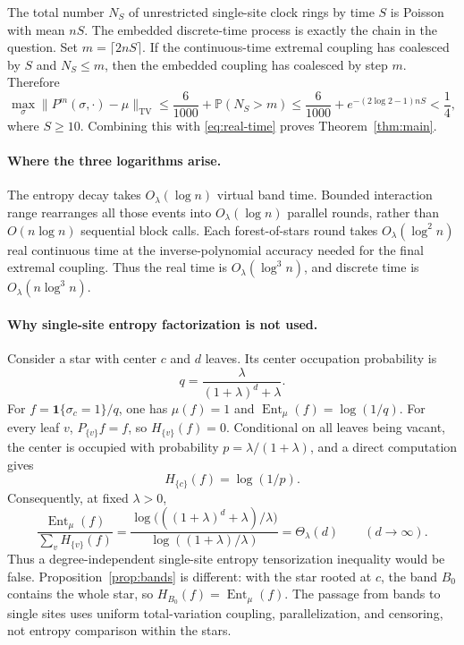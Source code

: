 \documentclass[11pt]{article}
\newcommand{\Prb}{\mathbb P}
\newcommand{\Ent}{\operatorname{Ent}}
\newcommand{\TV}{\operatorname{TV}}
\newcommand{\ind}{\mathbf 1}
\begin{document}
The total number $N_S$ of unrestricted single-site clock rings by time $S$ is Poisson with mean $nS$. The embedded discrete-time process is exactly the chain in the question. Set $m=\lceil2nS\rceil$. If the continuous-time extremal coupling has coalesced by $S$ and $N_S\le m$, then the embedded coupling has coalesced by step $m$. Therefore
\[
\max_\sigma\|P^m(\sigma,\cdot)-\mu\|_{\TV}
\le\frac6{1000}+\Prb(N_S>m)
\le\frac6{1000}+e^{-(2\log2-1)nS}<\frac14,
\]
where $S\ge10$. Combining this with \eqref{eq:real-time} proves Theorem~\ref{thm:main}.

\paragraph{Where the three logarithms arise.}
The entropy decay takes $O_\lambda(\log n)$ virtual band time. Bounded interaction range rearranges all those events into $O_\lambda(\log n)$ parallel rounds, rather than $O(n\log n)$ sequential block calls. Each forest-of-stars round takes $O_\lambda(\log^2 n)$ real continuous time at the inverse-polynomial accuracy needed for the final extremal coupling. Thus the real time is $O_\lambda(\log^3 n)$, and discrete time is $O_\lambda(n\log^3 n)$.

\paragraph{Why single-site entropy factorization is not used.}
Consider a star with center $c$ and $d$ leaves. Its center occupation probability is
\[
q=\frac{\lambda}{(1+\lambda)^d+\lambda}.
\]
For $f=\ind\{\sigma_c=1\}/q$, one has $\mu(f)=1$ and $\Ent_\mu(f)=\log(1/q)$. For every leaf $v$, $P_{\{v\}}f=f$, so $H_{\{v\}}(f)=0$. Conditional on all leaves being vacant, the center is occupied with probability $p=\lambda/(1+\lambda)$, and a direct computation gives
\[
H_{\{c\}}(f)=\log(1/p).
\]
Consequently, at fixed $\lambda>0$,
\[
\frac{\Ent_\mu(f)}{\sum_v H_{\{v\}}(f)}
=\frac{\log\bigl(((1+\lambda)^d+\lambda)/\lambda\bigr)}
{\log((1+\lambda)/\lambda)}
=\Theta_\lambda(d)\qquad(d\to\infty).
\]
Thus a degree-independent single-site entropy tensorization inequality would be false. Proposition~\ref{prop:bands} is different: with the star rooted at $c$, the band $B_0$ contains the whole star, so $H_{B_0}(f)=\Ent_\mu(f)$. The passage from bands to single sites uses uniform total-variation coupling, parallelization, and censoring, not entropy comparison within the stars.
\end{document}
